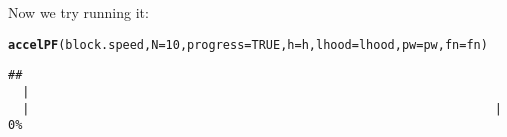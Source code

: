\documentclass[11pt]{article}\usepackage[]{graphicx}\usepackage[]{color}
\makeatletter
\newcommand{\hlnum}[1]{\textcolor[rgb]{0.686,0.059,0.569}{#1}}%
\newcommand{\hlstd}[1]{\textcolor[rgb]{0.345,0.345,0.345}{#1}}%
\newcommand{\hlkwc}[1]{\textcolor[rgb]{0.333,0.667,0.333}{#1}}%
\newcommand{\hlkwd}[1]{\textcolor[rgb]{0.737,0.353,0.396}{\textbf{#1}}}%
\newenvironment{kframe}{%
 \def\at@end@of@kframe{}%
 \ifinner\ifhmode%
  \def\at@end@of@kframe{\end{minipage}}%
  \begin{minipage}{\columnwidth}%
 \fi\fi%
 \def\FrameCommand##1{\hskip\@totalleftmargin \hskip-\fboxsep
 \colorbox{shadecolor}{##1}\hskip-\fboxsep
     \hskip-\linewidth \hskip-\@totalleftmargin \hskip\columnwidth}%
 \MakeFramed {\advance\hsize-\width
   \@totalleftmargin\z@ \linewidth\hsize
   \@setminipage}}%
 {\par\unskip\endMakeFramed%
 \at@end@of@kframe}
\newenvironment{knitrout}{}{} %
\makeatother
\begin{document}
Now we try running it:
\begin{knitrout}
\color{fgcolor}\begin{kframe}
\begin{alltt}
\hlkwd{accelPF}\hlstd{(block.speed,} \hlkwc{N} \hlstd{=} \hlnum{10}\hlstd{,} \hlkwc{progress} \hlstd{=} \hlnum{TRUE}\hlstd{,} \hlkwc{h} \hlstd{= h,} \hlkwc{lhood} \hlstd{= lhood,} \hlkwc{pw} \hlstd{= pw,} \hlkwc{fn} \hlstd{= fn)}
\end{alltt}
\begin{verbatim}
## 
  |                                                                       
  |                                                                 |   0%
\end{verbatim}


{\ttfamily\noindent\bfseries\color{errorcolor}{\#\# Error in rbind(x[1, ] + x[2, ] * u[1] + 0.5 * s(x[1, ], 1) * u[1]\textasciicircum{}2, x[2, : could not find function "{}s"{}}}\end{kframe}
\end{knitrout}
\end{document}
